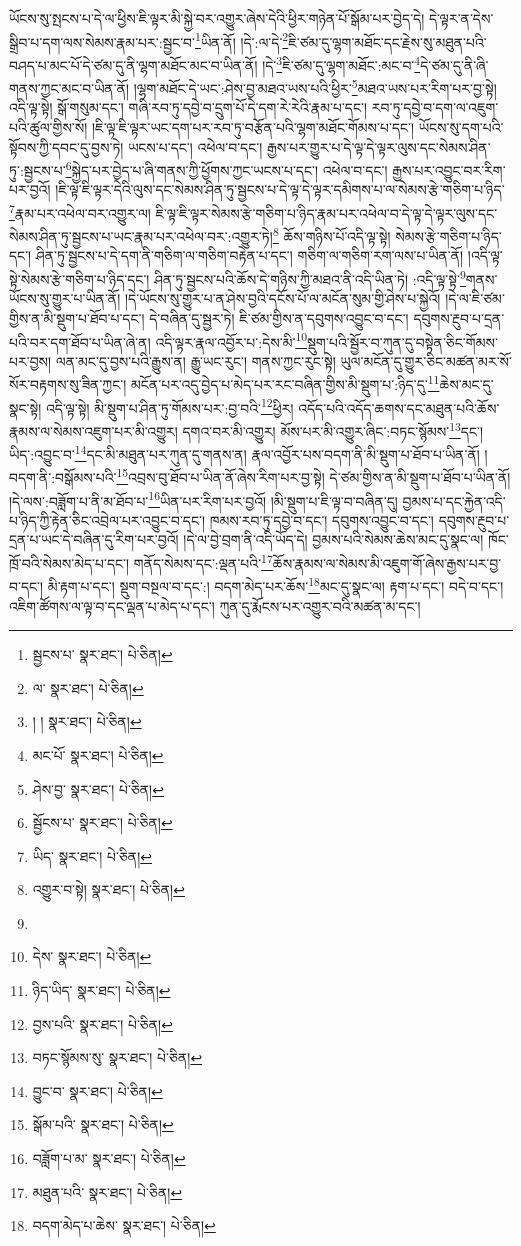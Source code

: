 ཡོངས་སུ་སྤངས་པ་དེ་ལ་ཕྱིས་ཇི་ལྟར་མི་སྐྱེ་བར་འགྱུར་ཞེས་དེའི་ཕྱིར་གཉེན་པོ་སྒོམ་པར་བྱེད་དེ། དེ་ལྟར་ན་དེས་སྒྲིབ་པ་དག་ལས་སེམས་རྣམ་པར་:སྦྱང་བ་\footnote{སྦྱངས་པ་  སྣར་ཐང་།  པེ་ཅིན། }ཡིན་ནོ། །དེ་:ལ་དེ་\footnote{ལ་  སྣར་ཐང་།  པེ་ཅིན། }ཇི་ཙམ་དུ་ལྷག་མཐོང་དང་རྗེས་སུ་མཐུན་པའི་བཤད་པ་མང་པོ་དེ་ཙམ་དུ་ནི་ལྷག་མཐོང་མང་བ་ཡིན་ནོ། །དེ་\footnote{། །  སྣར་ཐང་།  པེ་ཅིན། }ཇི་ཙམ་དུ་ལྷག་མཐོང་:མང་བ་\footnote{མང་པོ་  སྣར་ཐང་།  པེ་ཅིན། }དེ་ཙམ་དུ་ནི་ཞི་གནས་ཀྱང་མང་བ་ཡིན་ནོ། །ལྷག་མཐོང་དེ་ཡང་:ཤེས་བྱ་མཐའ་ཡས་པའི་ཕྱིར་\footnote{ཤེས་བྱ་  སྣར་ཐང་།  པེ་ཅིན། }མཐའ་ཡས་པར་རིག་པར་བྱ་སྟེ། འདི་ལྟ་སྟེ། སྒོ་གསུམ་དང་། གཞི་རབ་ཏུ་དབྱེ་བ་དྲུག་པོ་དེ་དག་རེ་རེའི་རྣམ་པ་དང་། རབ་ཏུ་དབྱེ་བ་དག་ལ་འཇུག་པའི་ཚུལ་གྱིས་སོ། །ཇི་ལྟ་ཇི་ལྟར་ཡང་དག་པར་རབ་ཏུ་བརྩོན་པའི་ལྷག་མཐོང་གོམས་པ་དང་། ཡོངས་སུ་དག་པའི་སྟོབས་ཀྱི་དབང་དུ་བྱས་ཏེ། ཡངས་པ་དང་། འཕེལ་བ་དང་། རྒྱས་པར་གྱུར་པ་དེ་ལྟ་དེ་ལྟར་ལུས་དང་སེམས་ཤིན་ཏུ་:སྦྱངས་པ་\footnote{སྦྱོངས་པ་  སྣར་ཐང་།  པེ་ཅིན། }སྐྱེད་པར་བྱེད་པ་ཞི་གནས་ཀྱི་ཕྱོགས་ཀྱང་ཡངས་པ་དང་། འཕེལ་བ་དང་། རྒྱས་པར་འབྱུང་བར་རིག་པར་བྱའོ། །ཇི་ལྟ་ཇི་ལྟར་དེའི་ལུས་དང་སེམས་ཤིན་ཏུ་སྦྱངས་པ་དེ་ལྟ་དེ་ལྟར་དམིགས་པ་ལ་སེམས་རྩེ་གཅིག་པ་ཉིད་\footnote{ཡིད་  སྣར་ཐང་།  པེ་ཅིན། }རྣམ་པར་འཕེལ་བར་འགྱུར་ལ། ཇི་ལྟ་ཇི་ལྟར་སེམས་རྩེ་གཅིག་པ་ཉིད་རྣམ་པར་འཕེལ་བ་དེ་ལྟ་དེ་ལྟར་ལུས་དང་སེམས་ཤིན་ཏུ་སྦྱངས་པ་ཡང་རྣམ་པར་འཕེལ་བར་:འགྱུར་ཏེ།\footnote{འགྱུར་བ་སྟེ།  སྣར་ཐང་།  པེ་ཅིན། } ཆོས་གཉིས་པོ་འདི་ལྟ་སྟེ། སེམས་རྩེ་གཅིག་པ་ཉིད་དང་། ཤིན་ཏུ་སྦྱངས་པ་དེ་དག་ནི་གཅིག་ལ་གཅིག་བརྟེན་པ་དང་། གཅིག་ལ་གཅིག་རག་ལས་པ་ཡིན་ནོ། །འདི་ལྟ་སྟེ་སེམས་རྩེ་གཅིག་པ་ཉིད་དང་། ཤིན་ཏུ་སྦྱངས་པའི་ཆོས་དེ་གཉིས་ཀྱི་མཐའ་ནི་འདི་ཡིན་ཏེ། :འདི་ལྟ་སྟེ་\footnote{}གནས་ཡོངས་སུ་གྱུར་པ་ཡིན་ནོ། །དེ་ཡོངས་སུ་གྱུར་པ་ན་ཤེས་བྱའི་དངོས་པོ་ལ་མངོན་སུམ་གྱི་ཤེས་པ་སྐྱེའོ། །དེ་ལ་ཇི་ཙམ་གྱིས་ན་མི་སྡུག་པ་ཐོབ་པ་དང་། དེ་བཞིན་དུ་སྦྱར་ཏེ། ཇི་ཙམ་གྱིས་ན་དབུགས་འབྱུང་བ་དང་། དབུགས་རྔུབ་པ་དྲན་པའི་བར་དག་ཐོབ་པ་ཡིན་ཞེ་ན། འདི་ལྟར་རྣལ་འབྱོར་པ་:དེས་མི་\footnote{དེས་  སྣར་ཐང་།  པེ་ཅིན། }སྡུག་པའི་སྦྱོར་བ་ཀུན་དུ་བསྟེན་ཅིང་གོམས་པར་བྱས། ལན་མང་དུ་བྱས་པའི་རྒྱུས་ན། རྒྱུ་ཡང་རུང་། གནས་ཀྱང་རུང་སྟེ། ཡུལ་མངོན་དུ་གྱུར་ཅིང་མཚན་མར་སོ་སོར་བརྟགས་སུ་ཟིན་ཀྱང་། མངོན་པར་འདུ་བྱེད་པ་མེད་པར་རང་བཞིན་གྱིས་མི་སྡུག་པ་:ཉིད་དུ་\footnote{ཉིད་ཡིད་  སྣར་ཐང་།  པེ་ཅིན། }ཆེས་མང་དུ་སྣང་སྟེ། འདི་ལྟ་སྟེ། མི་སྡུག་པ་ཤིན་ཏུ་གོམས་པར་:བྱ་བའི་\footnote{བྱས་པའི་  སྣར་ཐང་།  པེ་ཅིན། }ཕྱིར། འདོད་པའི་འདོད་ཆགས་དང་མཐུན་པའི་ཆོས་རྣམས་ལ་སེམས་འཇུག་པར་མི་འགྱུར། དགའ་བར་མི་འགྱུར། མོས་པར་མི་འགྱུར་ཞིང་:བཏང་སྙོམས་\footnote{བཏང་སྙོམས་སུ་  སྣར་ཐང་།  པེ་ཅིན། }དང་། ཡིད་:འབྱུང་བ་\footnote{བྱུང་བ་  སྣར་ཐང་།  པེ་ཅིན། }དང་མི་མཐུན་པར་ཀུན་དུ་གནས་ན། རྣལ་འབྱོར་པས་བདག་ནི་མི་སྡུག་པ་ཐོབ་པ་ཡིན་ནོ། །བདག་ནི་:བསྒོམས་པའི་\footnote{སྒོམ་པའི་  སྣར་ཐང་།  པེ་ཅིན། }འབྲས་བུ་ཐོབ་པ་ཡིན་ནོ་ཞེས་རིག་པར་བྱ་སྟེ། དེ་ཙམ་གྱིས་ན་མི་སྡུག་པ་ཐོབ་པ་ཡིན་ནོ། །དེ་ལས་:བཟློག་པ་ནི་མ་ཐོབ་པ་\footnote{བཟློག་པ་མ་  སྣར་ཐང་།  པེ་ཅིན། }ཡིན་པར་རིག་པར་བྱའོ། །མི་སྡུག་པ་ཇི་ལྟ་བ་བཞིན་དུ། བྱམས་པ་དང་རྐྱེན་འདི་པ་ཉིད་ཀྱི་རྟེན་ཅིང་འབྲེལ་པར་འབྱུང་བ་དང་། ཁམས་རབ་ཏུ་དབྱེ་བ་དང་། དབུགས་འབྱུང་བ་དང་། དབུགས་རྔུབ་པ་དྲན་པ་ཡང་དེ་བཞིན་དུ་རིག་པར་བྱའོ། །དེ་ལ་བྱེ་བྲག་ནི་འདི་ཡོད་དེ། བྱམས་པའི་སེམས་ཆེས་མང་དུ་སྣང་ལ། ཁོང་ཁྲོ་བའི་སེམས་མེད་པ་དང་། གནོད་སེམས་དང་:ལྡན་པའི་\footnote{མཐུན་པའི་  སྣར་ཐང་།  པེ་ཅིན། }ཆོས་རྣམས་ལ་སེམས་མི་འཇུག་གོ་ཞེས་རྒྱས་པར་བྱ་བ་དང་། མི་རྟག་པ་དང་། སྡུག་བསྔལ་བ་དང་:། བདག་མེད་པར་ཆོས་\footnote{བདག་མེད་པ་ཆེས་  སྣར་ཐང་།  པེ་ཅིན། }མང་དུ་སྣང་ལ། རྟག་པ་དང་། བདེ་བ་དང་། འཇིག་ཚོགས་ལ་ལྟ་བ་དང་ལྡན་པ་མེད་པ་དང་། ཀུན་དུ་རྨོངས་པར་འགྱུར་བའི་མཚན་མ་དང་། 